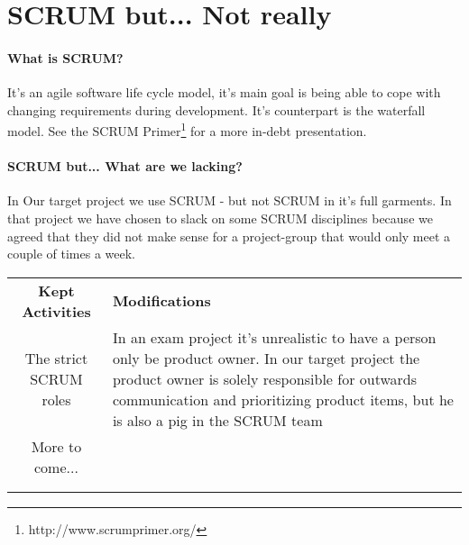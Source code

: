 \documentclass[../report.tex]{subfiles}
\begin{document}
\section{SCRUM but... Not really}


\paragraph{What is SCRUM?}
It's an agile software life cycle model, it's main goal is being able to cope with changing requirements during development. It's counterpart is the waterfall model. See the  SCRUM Primer\footnote{http://www.scrumprimer.org/} for a more in-debt presentation.

\paragraph{SCRUM but... What are we lacking?} In Our target project we use SCRUM - but not SCRUM in it's full garments. In that project we have chosen to slack on some SCRUM disciplines because we agreed that they did not make sense for a project-group that would only meet a couple of times a week.\\

\begin{tabular}{c|p{10cm}}
\textbf{Kept Activities}  & \textbf{Modifications} \\
The strict SCRUM roles & In an exam project it's unrealistic to have a person only be product owner. In our target project the product owner is solely responsible for outwards communication and prioritizing product items, but he is also a pig in the SCRUM team   \\ 
More to come... & \\
 & \\
 & \\
\end{tabular} 
\end{document}
